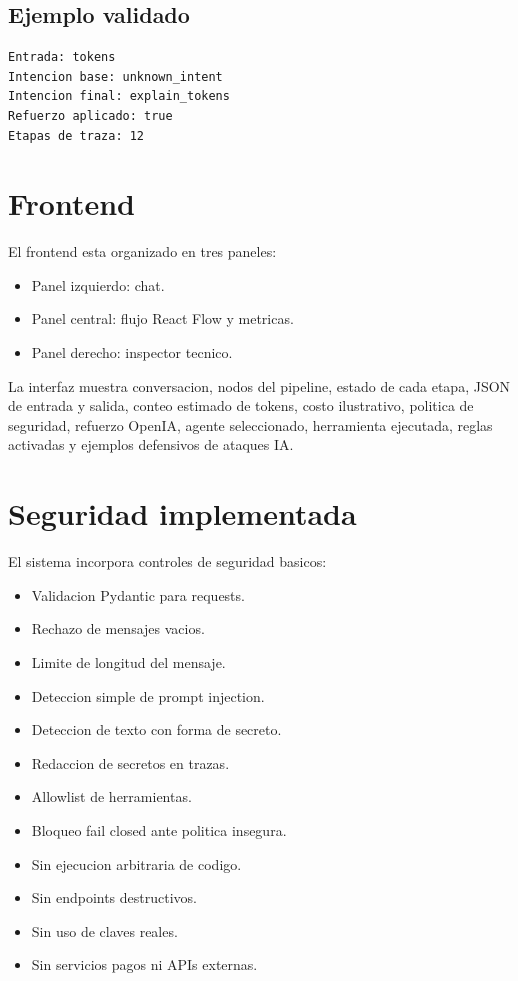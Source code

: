 \documentclass[12pt,letterpaper]{article}
\begin{document}
\subsection{Ejemplo validado}

\begin{lstlisting}[language={},caption={Refuerzo de intencion}]
Entrada: tokens
Intencion base: unknown_intent
Intencion final: explain_tokens
Refuerzo aplicado: true
Etapas de traza: 12
\end{lstlisting}

\section{Frontend}

El frontend esta organizado en tres paneles:

\begin{itemize}
  \item Panel izquierdo: chat.
  \item Panel central: flujo React Flow y metricas.
  \item Panel derecho: inspector tecnico.
\end{itemize}

La interfaz muestra conversacion, nodos del pipeline, estado de cada etapa, JSON de entrada y salida, conteo estimado de tokens, costo ilustrativo, politica de seguridad, refuerzo OpenIA, agente seleccionado, herramienta ejecutada, reglas activadas y ejemplos defensivos de ataques IA.

\section{Seguridad implementada}

El sistema incorpora controles de seguridad basicos:

\begin{itemize}
  \item Validacion Pydantic para requests.
  \item Rechazo de mensajes vacios.
  \item Limite de longitud del mensaje.
  \item Deteccion simple de prompt injection.
  \item Deteccion de texto con forma de secreto.
  \item Redaccion de secretos en trazas.
  \item Allowlist de herramientas.
  \item Bloqueo fail closed ante politica insegura.
  \item Sin ejecucion arbitraria de codigo.
  \item Sin endpoints destructivos.
  \item Sin uso de claves reales.
  \item Sin servicios pagos ni APIs externas.
\end{itemize}
\end{document}
